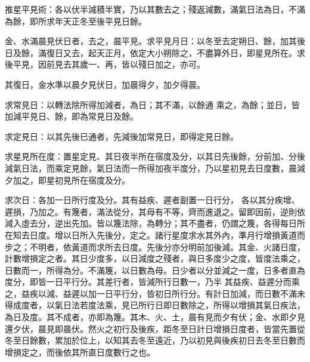 \begin{pinyinscope}
 推星平見術：各以伏半減積半實，乃以其數去之；殘返減數，滿氣日法為日，不滿為餘，即所求年天正冬至後平見日餘。



 金、水滿晨見伏日者，去之，晨平見。求平見月日：以冬至去定朔日、餘，加其後日及餘，滿復日又去，起天正月，依定大小朔除之，不盡算外日，即星見所在。求後平見，因前見去其歲一、再，皆以殘日加之，亦可。



 其復日，金水準以晨夕見伏日，加晨得夕，加夕得晨。



 求常見日：以轉法除所得加減者，為日；其不滿，以餘通
 乘之，為餘；並日，皆加減平見日、餘，即為常見日及餘。



 求定見日：以其先後已通者，先減後加常見日，即得定見日餘。



 求星見所在度：置星定見、其日夜半所在宿度及分，以其日先後餘，分前加、分後減氣日法，而乘定見餘，氣日法而一所得加夜半度分，乃以星初見去日度數，晨減夕加之，即星初見所在宿度及分。



 求次日：各加一日所行度及分。其有益疾、遲者副置一日行分，
 各以其分疾增、遲損，乃加之。有篾者，滿法從分，其母有不等，齊而進退之。留即因前，逆則依減入虛去分，逆出先加。皆以篾法除，為轉分；其不盡者，仍謂之篾，各得每日所在知去日度。增以日所入先後分，定之。諸行星度求水其外內，準月行增損黃道而步之；不明者，依黃道而求所去日度。先後分亦分明前加後減。其金、火諸日度，計數增損定之者。其日少度多，以日減度之殘者，與日多度少之度，皆度法乘之，日數而一，所得為分。不滿篾，以日數為母。日少者以分並減之一度，日多者直為度分，即皆一日平行分。其差行者，皆減所行日數一，乃半
 其益疾、益遲分而乘之，益疾以減、益遲以加一日平行分，皆初日所行分。有計日加減，而日數不滿未得成度者，以氣日法若度法乘，見已所行日即日數除之，所得以增損其氣日疾法，為日及度。其不成者，亦即為篾。其木、火、土，晨有見而夕有伏；金、水即夕見還夕伏，晨見即晨伏。然火之初行及後疾，距冬至日計日增損日度者，皆當先置從冬至日餘數，累加於位上，以知其去冬至遠近，乃以初見與後疾初日去冬至日數而增損定之，而後依其所直日度數行之也。



\end{pinyinscope}